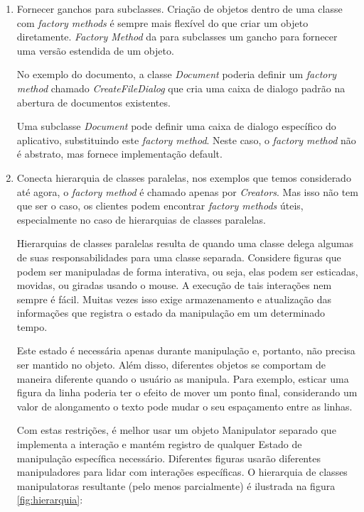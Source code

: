 \begin{enumerate}
	\item Fornecer ganchos para subclasses. Criação de objetos dentro de uma classe com \emph{factory methods} é sempre mais flexível do que criar um objeto diretamente. \emph{Factory Method} da para subclasses um gancho para fornecer uma versão estendida
de um objeto.

No exemplo do documento, a classe \emph{Document} poderia definir um \emph{factory method} chamado \emph{CreateFileDialog} que cria uma caixa de dialogo padrão na abertura de documentos existentes.

Uma subclasse \emph{Document} pode definir uma caixa de dialogo específico do aplicativo, substituindo este \emph{factory method}. Neste caso, o \emph{factory method} não é abstrato, mas fornece implementação default.

	\item
Conecta hierarquia de classes paralelas, nos exemplos que temos considerado até agora, o \emph{factory method} é chamado apenas por \emph{Creators}. Mas isso não tem que ser o caso, os clientes podem encontrar \emph{factory methods} úteis, especialmente no caso de hierarquias de classes paralelas.

Hierarquias de classes paralelas resulta de quando uma classe delega algumas de suas responsabilidades para uma classe separada.
Considere figuras que podem ser manipuladas de forma interativa, ou seja, elas podem ser esticadas, movidas, ou giradas usando o mouse. A execução de tais interações nem sempre é fácil. Muitas vezes isso exige armazenamento e atualização das informações que registra o estado da manipulação em um determinado tempo.

Este estado é necessária apenas durante manipulação e, portanto, não precisa ser mantido no objeto. Além disso, diferentes objetos se comportam de maneira diferente quando o usuário as manipula. Para exemplo, esticar uma figura da linha poderia ter o efeito de mover um ponto final, considerando um valor de alongamento o texto pode mudar o seu espaçamento entre as linhas.

Com estas restrições, é melhor usar um objeto Manipulator separado que implementa a interação e mantém registro de qualquer
Estado de manipulação específica necessário. 
Diferentes figuras usarão diferentes manipuladores para lidar com interações específicas. O hierarquia de classes manipulatoras resultante (pelo menos parcialmente) é ilustrada na figura \ref{fig:hierarquia}:

\end{enumerate}

